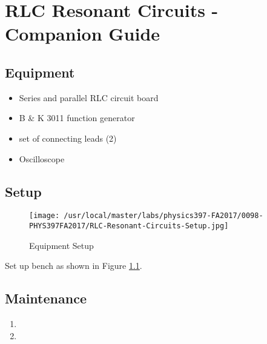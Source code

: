 \AtEndDocument{\clearpage\ifodd\value{page}\else\null\clearpage\fi} %

%
%


\chapter{RLC Resonant Circuits - Companion Guide}

\section{Equipment}
\begin{minipage}[t]{0.6\textwidth}
\begin{itemize}[noitemsep]
\item Series and parallel RLC circuit board
\item B \& K 3011 function generator
\item set of connecting leads (2)
\end{itemize}
\end{minipage}
\begin{minipage}[t]{0.35\textwidth}
\begin{itemize}[noitemsep]
\item Oscilloscope
\end{itemize}
\end{minipage}


\section{Setup}
\begin{figure}
\texttt{[image: /usr/local/master/labs/physics397-FA2017/0098-PHYS397FA2017/RLC-Resonant-Circuits-Setup.jpg]}
\caption{Equipment Setup}
\label{pic:RLCsetup}
\end{figure}

Set up bench as shown in Figure \ref{pic:RLCsetup}.

\section{Maintenance}

\begin{enumerate}
\item 
\item 
\end{enumerate}

